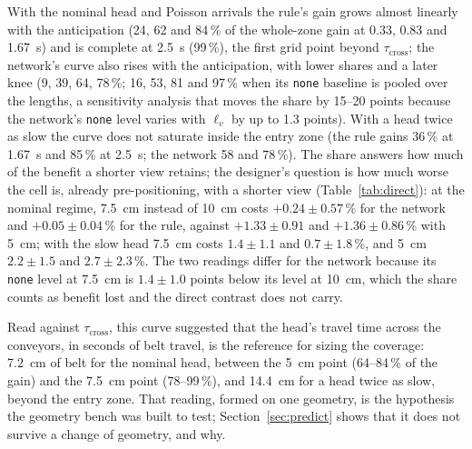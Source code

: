 \documentclass[11pt,a4paper]{article}
\newcommand{\tcross}{\tau_{\mathrm{cross}}}
\newcommand{\lv}{\ell_{v}}
\begin{document}
With the nominal head and Poisson arrivals the rule's gain grows almost linearly with the
anticipation (24, 62 and 84\,\% of the whole-zone gain at 0.33, 0.83 and 1.67~s) and is
complete at 2.5~s (99\,\%), the first grid point beyond $\tcross$; the network's curve also
rises with the anticipation, with lower shares and a later knee (9, 39, 64, 78\,\%; 16, 53, 81 and 97\,\% when its
\texttt{none} baseline is pooled over the lengths, a sensitivity analysis that moves the
share by 15--20 points because the network's \texttt{none} level varies with $\lv$ by up
to 1.3 points). With a head twice as slow the curve does not saturate inside the entry
zone (the rule gains 36\,\% at 1.67~s and 85\,\% at 2.5~s; the network 58 and 78\,\%). The
share answers how much of the benefit a shorter view retains; the designer's question is
how much worse the cell is, already pre-positioning, with a shorter view
(Table~\ref{tab:direct}): at the nominal regime, 7.5~cm instead of 10~cm costs
$+0.24\pm0.57$\,\% for the network and $+0.05\pm0.04$\,\% for the rule, against
$+1.33\pm0.91$ and $+1.36\pm0.86$\,\% with 5~cm; with the slow head 7.5~cm costs
$1.4\pm1.1$ and $0.7\pm1.8$\,\%, and 5~cm $2.2\pm1.5$ and $2.7\pm2.3$\,\%. The two
readings differ for the network because its \texttt{none} level at 7.5~cm is $1.4\pm1.0$
points below its level at 10~cm, which the share counts as benefit lost and the direct
contrast does not carry.

\begin{table}[t]
\centering\small
\caption{Reference cell: two answers to ``is a shorter view enough?'' Left: cost of
pre-positioning with 5 or 7.5~cm against with the whole 10~cm zone (\texttt{when\_idle}
at both lengths; paired $\Delta$ of the penalized flow time, \%, 95\,\% CI; positive = the
shorter view costs more; in parentheses, realizations in which the shorter view was
better). Right: pre-positioning benefit lost, the gain of Table~\ref{tab:coverage} at
the shorter length minus the gain at 10~cm, per realization (points). A secondary
analysis of the phase-4 data, added after the run. Bold: the
interval excludes zero. Seeds 7000--7029, shared with the companion paper.}
\label{tab:direct}
\resizebox{\linewidth}{!}{}
\end{table}

Read against $\tcross$, this curve suggested that the head's travel time across the
conveyors, in seconds of belt travel, is the reference for sizing the coverage: 7.2~cm
of belt for the nominal head, between the 5~cm point (64--84\,\% of the gain) and the
7.5~cm point (78--99\,\%), and 14.4~cm for a head twice as slow, beyond the entry zone.
That reading, formed on one geometry, is the hypothesis the geometry bench was built to
test; Section~\ref{sec:predict} shows that it does not survive a change of geometry, and
why.
\end{document}
